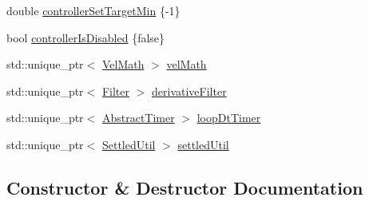 \begin{DoxyCompactItemize}
\item 
double \mbox{\hyperlink{classokapi_1_1IterativeVelPIDController_a4aab3639e59de813e98b1b9eddc60f11}{controller\+Set\+Target\+Min}} \{-\/1\}
\item 
bool \mbox{\hyperlink{classokapi_1_1IterativeVelPIDController_a0732ec5a765af01af100370d54754fc4}{controller\+Is\+Disabled}} \{false\}
\item 
std\+::unique\+\_\+ptr$<$ \mbox{\hyperlink{classokapi_1_1VelMath}{Vel\+Math}} $>$ \mbox{\hyperlink{classokapi_1_1IterativeVelPIDController_ada933662b0e7fc732590a46dfc643945}{vel\+Math}}
\item 
std\+::unique\+\_\+ptr$<$ \mbox{\hyperlink{classokapi_1_1Filter}{Filter}} $>$ \mbox{\hyperlink{classokapi_1_1IterativeVelPIDController_af017ec38ad8aa08ef50459e957cc7e3a}{derivative\+Filter}}
\item 
std\+::unique\+\_\+ptr$<$ \mbox{\hyperlink{classokapi_1_1AbstractTimer}{Abstract\+Timer}} $>$ \mbox{\hyperlink{classokapi_1_1IterativeVelPIDController_a2c0baa9245befaa18bba4cb22f541594}{loop\+Dt\+Timer}}
\item 
std\+::unique\+\_\+ptr$<$ \mbox{\hyperlink{classokapi_1_1SettledUtil}{Settled\+Util}} $>$ \mbox{\hyperlink{classokapi_1_1IterativeVelPIDController_af37e9751a7e976232074b855efefa06b}{settled\+Util}}
\end{DoxyCompactItemize}


\subsection{Constructor \& Destructor Documentation}
\mbox{\label{classokapi_1_1IterativeVelPIDController_a99d21352f8acdbc54e47d77c193cb641}} 
